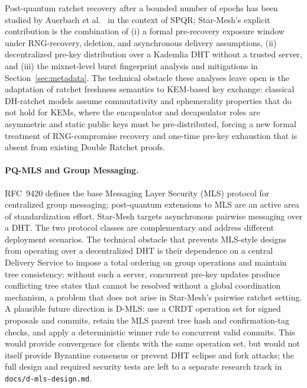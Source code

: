 \documentclass[11pt,a4paper]{article}
\theoremstyle{remark}
\theoremstyle{plain}
\begin{document}
Post-quantum ratchet recovery after a bounded number of epochs has been studied by
Auerbach et al.\ \cite{auerbach2025compare} in the context of SPQR; Star-Mesh's explicit
contribution is the combination of (i) a formal pre-recovery exposure window under
RNG-recovery, deletion, and asynchronous delivery assumptions, (ii) decentralized
pre-key distribution over a Kademlia DHT without a trusted server, and (iii) the
mixnet-level burst fingerprint analysis and mitigations in Section~\ref{sec:metadata}.
The technical obstacle these analyses leave open is the adaptation of ratchet freshness
semantics to KEM-based key exchange: classical DH-ratchet models assume commutativity and
ephemerality properties that do not hold for KEMs, where the encapsulator and decapsulator
roles are asymmetric and static public keys must be pre-distributed, forcing a new formal
treatment of RNG-compromise recovery and one-time pre-key exhaustion that is absent from
existing Double Ratchet proofs.

\paragraph{PQ-MLS and Group Messaging.}
RFC~9420 \cite{rfc9420} defines the base Messaging Layer Security (MLS) protocol for
centralized group messaging; post-quantum extensions to MLS are an active area of
standardization effort.  Star-Mesh targets asynchronous pairwise messaging over a DHT.
The two protocol classes are complementary and address different deployment scenarios.
The technical obstacle that prevents MLS-style designs from operating over a decentralized
DHT is their dependence on a central Delivery Service to impose a total ordering on group
operations and maintain tree consistency: without such a server, concurrent pre-key updates
produce conflicting tree states that cannot be resolved without a global coordination
mechanism, a problem that does not arise in Star-Mesh's pairwise ratchet setting.  A plausible
future direction is D-MLS: use a CRDT operation set for signed proposals and commits, retain the
MLS parent tree hash and confirmation-tag checks, and apply a deterministic winner rule to
concurrent valid commits.  This would provide convergence for clients with the same operation
set, but would not itself provide Byzantine consensus or prevent DHT eclipse and fork attacks;
the full design and required security tests are left to a separate research track in
\texttt{docs/d-mls-design.md}.
\end{document}
